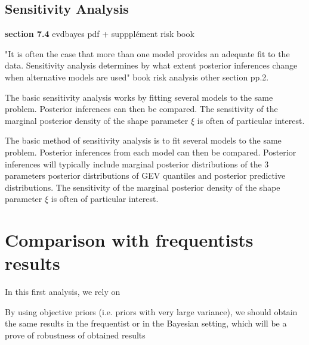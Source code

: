 \subsection{Sensitivity Analysis}

\textbf{section 7.4} evdbayes pdf + suppplément risk book 

"It is often the case that more than one model provides an adequate fit to the data. Sensitivity analysis determines by what extent posterior inferences change when alternative
models are used"   book risk analysis other section pp.2.



The basic sensitivity analysis works by fitting several models to
the same problem. Posterior inferences can then be compared.
The sensitivity of the
marginal posterior density of the shape parameter $\xi$ is often of particular interest.


The basic method of sensitivity analysis is to fit several models to the same problem.
 Posterior inferences from each model can then be compared. Posterior inferences
will typically include marginal posterior distributions of the 3 parameters posterior distributions of GEV quantiles and posterior predictive distributions.
The sensitivity of the marginal posterior density of the shape parameter $\xi$ is often of particular interest.




\section{Comparison with frequentists results}

In this first analysis, we rely on 


By using objective priors (i.e. priors with very large variance), we should obtain the same results in the frequentist or in the Bayesian setting, which will be a prove of robustness of obtained results  
